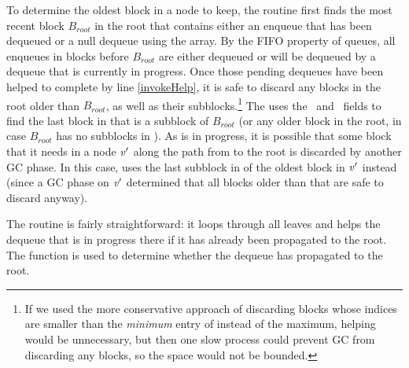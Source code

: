 To determine the oldest block in a node  to keep, the  routine  first
finds the most recent block $B_{root}$ in the root that contains either an enqueue that has been dequeued
or a null dequeue using the  array.  By the FIFO property of queues, all enqueues in blocks before $B_{root}$ are either
dequeued or will be dequeued by a dequeue that is currently in progress.  Once those pending dequeues have been
helped to complete by line \ref{invokeHelp},
it is safe to discard any blocks in the root older than $B_{root}$, as well
as their subblocks.\footnote{If we used the more conservative approach of discarding blocks whose indices 
are smaller than the \emph{minimum} entry of  instead of the maximum, helping would be unnecessary, but then one slow process could prevent GC from discarding any blocks, so the space would not be bounded.}
The  uses the \eleft\ and \eright\ fields to find the last block in  that is a subblock
of $B_{root}$ (or any older block in the root, in case $B_{root}$ has no subblocks in ).
As  is in progress, it is possible that some block that it needs in a node $\mbox{\textnormal{\textit{v}}}'$
along the path from  to the root is discarded by another GC phase.
In this case,  uses the last subblock in  of the oldest block in $\mbox{\textnormal{\textit{v}}}'$ instead
(since a GC phase on $\mbox{\textnormal{\textit{v}}}'$ determined that all blocks older than that are safe to discard anyway).

The  routine is fairly straightforward:  it loops through all leaves and
helps the dequeue that is in progress there if it has already been propagated to the root.
The  function is used to determine whether the dequeue has propagated to the root.

\renewcommand{\algorithmiccomment}[1]{\hfill\eqparbox{COMMENTDOUBLE}{\com\ #1}}


